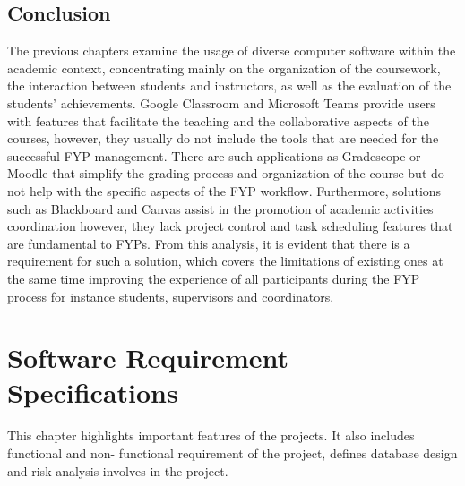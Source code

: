 \documentclass{FastFyp}
\begin{document}
\section{Conclusion}
The previous chapters examine the usage of diverse computer software within the academic context, concentrating mainly on the organization of the coursework, the interaction between students and instructors, as well as the evaluation of the students’ achievements. Google Classroom \cite{ref:classroom} and Microsoft Teams \cite{ref:teams} provide users with features that facilitate the teaching and the collaborative aspects of the courses, however, they usually do not include the tools that are needed for the successful FYP management. There are such applications as Gradescope \cite{ref:gradescope} or Moodle \cite{ref:moodle} that simplify the grading process and organization of the course but do not help with the specific aspects of the FYP workflow. Furthermore, solutions such as Blackboard \cite{ref:blackboard} and Canvas \cite{ref:canvas} assist in the promotion of academic activities coordination however, they lack project control and task scheduling features that are fundamental to FYPs. From this analysis, it is evident that there is a requirement for such a solution, which covers the limitations of existing ones at the same time improving the experience of all participants during the FYP process for instance students, supervisors and coordinators.
 
\chapter{Software Requirement Specifications}
This chapter highlights important features of the projects. It also includes functional and non-
functional requirement of the project, defines database design and risk analysis involves in the
project.
\end{document}
